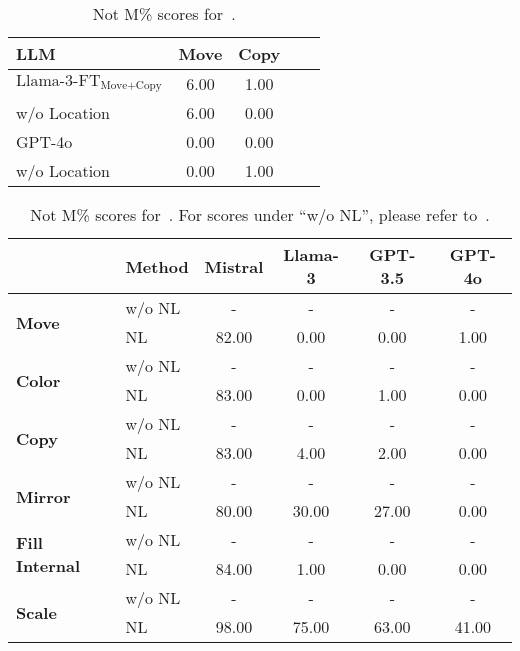 \begin{table}[tb]
\small
\centering
\setlength{\tabcolsep}{4mm}
\begin{tabular}{l|cccc}
\toprule
LLM& Move & Copy \\
\midrule
$\text{Llama-3-FT}_{\text{Move+Copy}}$ &6.00&1.00 \\
 \quad \quad \quad w/o Location &6.00&0.00\\
 \midrule
GPT-4o &0.00&0.00\\
 \quad \quad \quad w/o Location &0.00&1.00 \\
\bottomrule
\end{tabular}
\caption{Not M\% scores for~.}

\vspace{-0.1in}
\label{tab:location_plus}
\end{table}

\begin{table}[tb]
\small
\centering
\setlength{\tabcolsep}{0.5mm}
\begin{tabular}{ll|cccc}
\toprule
& \textbf{Method}& \textbf{Mistral}& \textbf{Llama-3} & \textbf{GPT-3.5}& \textbf{GPT-4o} \\
\midrule[0.5pt]
\multirow{2}{*}{\textbf{Move}}& w/o NL &-&-&-&-\\
& NL &82.00&0.00&0.00& 1.00\\
\midrule[0.5pt]
\multirow{2}{*}{\textbf{Color}}& w/o NL &-&-&-&- \\
& NL &83.00&0.00&1.00&0.00\\
\midrule[0.5pt]
\multirow{2}{*}{\textbf{Copy}}& w/o NL &-&-&-&- \\
& NL &83.00&4.00&2.00&0.00 \\
\midrule[0.5pt]
\multirow{2}{*}{\textbf{Mirror}}& w/o NL &-&-&-&- \\
& NL &80.00&30.00&27.00&0.00\\
\midrule[0.5pt]
\multirow{2}{*}{\textbf{Fill Internal}}& w/o NL &-&-&-&-\\
& NL &84.00&1.00&0.00&0.00\\
\midrule[0.5pt]
\multirow{2}{*}{\textbf{Scale}}& w/o NL &-&-&-&-\\
& NL &98.00&75.00&63.00&41.00 \\
\bottomrule
\end{tabular}
\caption{Not M\% scores for~. For scores under ``w/o NL'', please refer to~.}
\vspace{-0.1in}
\label{tab:natural language input_plus}
\end{table}

